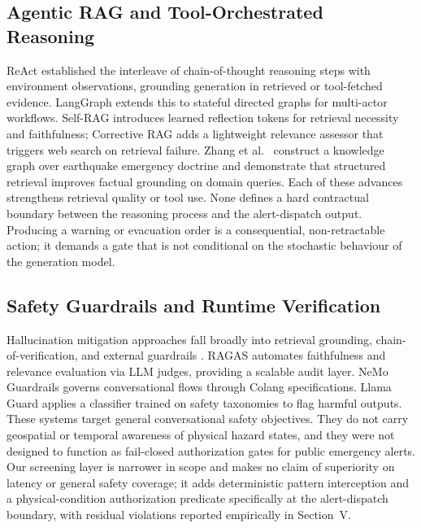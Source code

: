 \documentclass[conference]{IEEEtran}
\begin{document}
\subsection{Agentic RAG and Tool-Orchestrated Reasoning}
ReAct \cite{react} established the interleave of chain-of-thought reasoning steps with environment observations, grounding generation in retrieved or tool-fetched evidence. LangGraph \cite{langgraph} extends this to stateful directed graphs for multi-actor workflows. Self-RAG \cite{selfrag} introduces learned reflection tokens for retrieval necessity and faithfulness; Corrective RAG \cite{crag} adds a lightweight relevance assessor that triggers web search on retrieval failure. Zhang et al.\ \cite{zhang2024} construct a knowledge graph over earthquake emergency doctrine and demonstrate that structured retrieval improves factual grounding on domain queries. Each of these advances strengthens retrieval quality or tool use. None defines a hard contractual boundary between the reasoning process and the alert-dispatch output. Producing a warning or evacuation order is a consequential, non-retractable action; it demands a gate that is not conditional on the stochastic behaviour of the generation model.

\subsection{Safety Guardrails and Runtime Verification}
Hallucination mitigation approaches fall broadly into retrieval grounding, chain-of-verification, and external guardrails \cite{ji,yu2024}. RAGAS \cite{ragas} automates faithfulness and relevance evaluation via LLM judges, providing a scalable audit layer. NeMo Guardrails \cite{nemoguardrails} governs conversational flows through Colang specifications. Llama Guard \cite{inan2023} applies a classifier trained on safety taxonomies to flag harmful outputs. These systems target general conversational safety objectives. They do not carry geospatial or temporal awareness of physical hazard states, and they were not designed to function as fail-closed authorization gates for public emergency alerts. Our screening layer is narrower in scope and makes no claim of superiority on latency or general safety coverage; it adds deterministic pattern interception and a physical-condition authorization predicate specifically at the alert-dispatch boundary, with residual violations reported empirically in Section~V.
\end{document}
